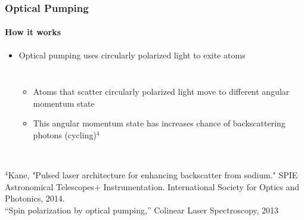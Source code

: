 \documentclass{beamer}
\begin{document}
\begin{frame}
  \frametitle{Optical Pumping}
  \framesubtitle{How it works}
  \begin{itemize}
	\item Optical pumping uses circularly polarized light to exite atoms
	  \begin{columns}
	  \begin{itemize}
		\item Atoms that scatter circularly polarized light move to different angular momentum state
		\item This angular momentum state has increases chance of backscattering photons (cycling)$^4$\\
	  \end{itemize}
\end{columns}
  \end{itemize}
\\{\tiny $^4$Kane, "Pulsed laser architecture for enhancing backscatter from sodium." SPIE Astronomical Telescopes+ Instrumentation. International Society for Optics and Photonics, 2014.}\\
{\tiny ``Spin polarization by optical pumping,'' Colinear Laser Spectroscopy, 2013}
 
\end{frame}


\end{document}
